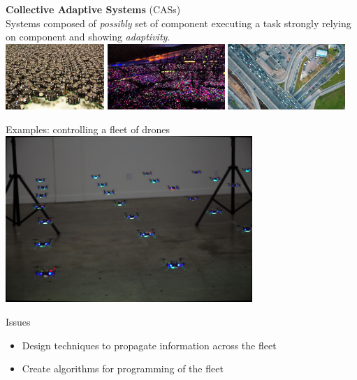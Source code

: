 \documentclass[presentation, 9pt]{beamer}\mode<presentation>{\usetheme{AMSBolognaFC}}
\begin{document}
\begin{frame}[plain,c]
	\begin{center}
	{\Huge \textbf{Collective Adaptive Systems} (CASs)}\\
	{\large Systems composed of \emph{possibly}  set of component executing a  task strongly relying on component  and showing  \emph{adaptivity}.}\\[0.3cm]
	\includegraphics[width=0.28\textwidth]{img/swarms.jpg}
	\includegraphics[width=0.333\textwidth]{img/coldplay.jpg}
	\includegraphics[width=0.333\textwidth]{img/traffic.jpg}	
	\end{center}
\end{frame}
\begin{frame}{Examples: controlling a fleet of drones}
\centering
\includegraphics[width=0.7\textwidth]{img/crazyflies}
\begin{alertblock}{Issues}
\begin{itemize}
	\item Design techniques to  propagate information across the fleet
	\item Create algorithms for  programming of the fleet
\end{itemize}
\end{alertblock}
\end{frame}
\end{document}

